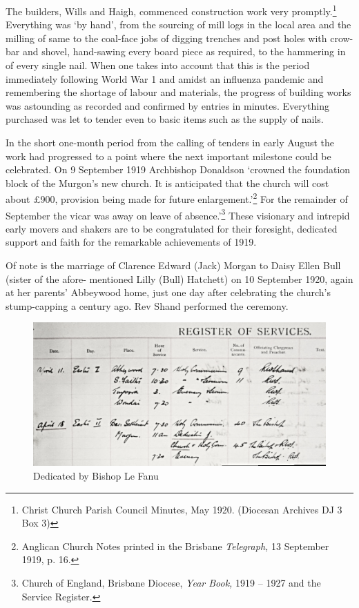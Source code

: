 The builders, Wills and Haigh, commenced construction work very
promptly.\footnote{Christ Church Parish Council Minutes, May 1920.
  (Diocesan Archives DJ 3 Box 3)} Everything was `by hand', from the
sourcing of mill logs in the local area and the milling of same to the
coal-face jobs of digging trenches and post holes with crow-bar and
shovel, hand-sawing every board piece as required, to the hammering in
of every single nail. When one takes into account that this is the
period immediately following World War 1 and amidst an influenza
pandemic and remembering the shortage of labour and materials, the
progress of building works was astounding as recorded and confirmed by
entries in minutes. Everything purchased was let to tender even to basic
items such as the supply of nails.

In the short one-month period from the calling of tenders in early
August the work had progressed to a point where the next important
milestone could be celebrated. On 9 September 1919 Archbishop Donaldson
`crowned the foundation block of the Murgon's new church. It is
anticipated that the church will cost about \pounds900, provision being made
for future enlargement.'\footnote{Anglican Church Notes printed in the
  Brisbane \emph{Telegraph,} 13 September 1919, p. 16.} For the
remainder of September the vicar was away on leave of
absence.'\footnote{Church of England, Brisbane Diocese, \emph{Year
  Book,} 1919 -- 1927 and the Service Register.} These visionary and
intrepid early movers and shakers are to be congratulated for their
foresight, dedicated support and faith for the remarkable achievements
of 1919.

Of note is the marriage of Clarence Edward (Jack) Morgan to Daisy Ellen
Bull (sister of the afore- mentioned Lilly (Bull) Hatchett) on 10
September 1920, again at her parents' Abbeywood home, just one day after
celebrating the church's stump-capping a century ago. Rev Shand
performed the ceremony.




\begin{figure}[!h]
\begin{center}
\includegraphics[width=.9\textwidth,center]{images/dedicationByBishopLeFanu.jpg}
\caption{Dedicated by Bishop Le Fanu}
\end{center}
\end{figure}


